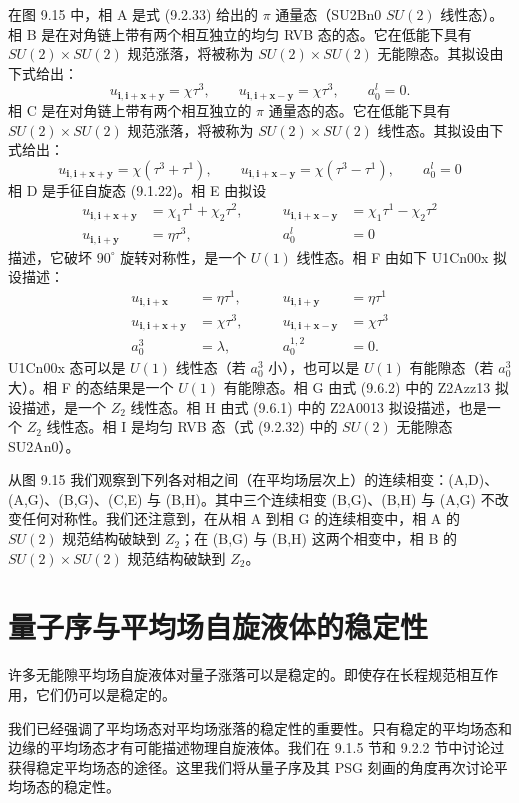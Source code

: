 在图 9.15 中，相 A 是式 (9.2.33) 给出的 $\pi$ 通量态（SU2Bn0 $SU(2)$ 线性态）。相 B 是在对角链上带有两个相互独立的均匀 RVB 态的态。它在低能下具有 $SU(2)\times SU(2)$ 规范涨落，将被称为 $SU(2)\times SU(2)$ 无能隙态。其拟设由下式给出：
\begin{equation*}
u_{\pmb{i},\pmb{i}+\pmb{x}+\pmb{y}}=\chi\tau^{3},\qquad
u_{\pmb{i},\pmb{i}+\pmb{x}-\pmb{y}}=\chi\tau^{3},\qquad
a_0^{l}=0.
\tag{9.8.6}
\end{equation*}
相 C 是在对角链上带有两个相互独立的 $\pi$ 通量态的态。它在低能下具有 $SU(2)\times SU(2)$ 规范涨落，将被称为 $SU(2)\times SU(2)$ 线性态。其拟设由下式给出：
\begin{equation*}
u_{\pmb{i},\pmb{i}+\pmb{x}+\pmb{y}}=\chi(\tau^{3}+\tau^{1}),\qquad
u_{\pmb{i},\pmb{i}+\pmb{x}-\pmb{y}}=\chi(\tau^{3}-\tau^{1}),\qquad
a_0^{l}=0
\tag{9.8.7}
\end{equation*}
相 D 是手征自旋态 (9.1.22)。相 E 由拟设
\begin{equation*}
\begin{aligned}
u_{\pmb{i},\pmb{i}+\pmb{x}+\pmb{y}}&=\chi_1\tau^{1}+\chi_2\tau^{2}, &\qquad
u_{\pmb{i},\pmb{i}+\pmb{x}-\pmb{y}}&=\chi_1\tau^{1}-\chi_2\tau^{2}\\
u_{\pmb{i},\pmb{i}+\pmb{y}}&=\eta\tau^{3}, &\qquad
a_0^{l}&=0
\end{aligned}
\tag{9.8.8}
\end{equation*}
描述，它破坏 $90^{\circ}$ 旋转对称性，是一个 $U(1)$ 线性态。相 F 由如下 U1Cn00x 拟设描述：
\begin{equation*}
\begin{aligned}
u_{\pmb{i},\pmb{i}+\pmb{x}}&=\eta\tau^{1}, &\qquad
u_{\pmb{i},\pmb{i}+\pmb{y}}&=\eta\tau^{1}\\
u_{\pmb{i},\pmb{i}+\pmb{x}+\pmb{y}}&=\chi\tau^{3}, &\qquad
u_{\pmb{i},\pmb{i}+\pmb{x}-\pmb{y}}&=\chi\tau^{3}\\
a_0^{3}&=\lambda, &\qquad
a_0^{1,2}&=0.
\end{aligned}
\tag{9.8.9}
\end{equation*}
U1Cn00x 态可以是 $U(1)$ 线性态（若 $a_0^{3}$ 小），也可以是 $U(1)$ 有能隙态（若 $a_0^{3}$ 大）。相 F 的态结果是一个 $U(1)$ 有能隙态。相 G 由式 (9.6.2) 中的 Z2Azz13 拟设描述，是一个 $Z_2$ 线性态。相 H 由式 (9.6.1) 中的 Z2A0013 拟设描述，也是一个 $Z_2$ 线性态。相 I 是均匀 RVB 态（式 (9.2.32) 中的 $SU(2)$ 无能隙态 SU2An0）。

从图 9.15 我们观察到下列各对相之间（在平均场层次上）的连续相变：(A,D)、(A,G)、(B,G)、(C,E) 与 (B,H)。其中三个连续相变 (B,G)、(B,H) 与 (A,G) 不改变任何对称性。我们还注意到，在从相 A 到相 G 的连续相变中，相 A 的 $SU(2)$ 规范结构破缺到 $Z_2$；在 (B,G) 与 (B,H) 这两个相变中，相 B 的 $SU(2)\times SU(2)$ 规范结构破缺到 $Z_2$。

\section{量子序与平均场自旋液体的稳定性}

\begin{keypoints}
\item 许多无能隙平均场自旋液体对量子涨落可以是稳定的。即使存在长程规范相互作用，它们仍可以是稳定的。
\end{keypoints}

我们已经强调了平均场态对平均场涨落的稳定性的重要性。只有稳定的平均场态和边缘的平均场态才有可能描述物理自旋液体。我们在 9.1.5 节和 9.2.2 节中讨论过获得稳定平均场态的途径。这里我们将从量子序及其 PSG 刻画的角度再次讨论平均场态的稳定性。
